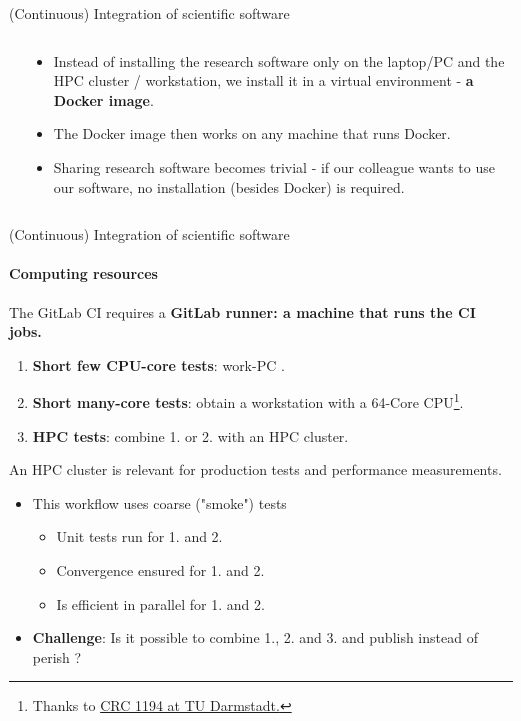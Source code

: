 \begin{frame}{(Continuous) Integration of scientific software}
\begin{columns}
\begin{column}[c]{0.4\textwidth}
        \end{column}
        \begin{column}[c]{0.6\textwidth}
            \begin{itemize}
                \item Instead of installing the research software only on the laptop/PC and the HPC cluster / workstation, we install it in a virtual environment - \textbf{a Docker image}.
                \item The Docker image then works on any machine that runs Docker. 
                \item Sharing research software becomes trivial - if our colleague wants to use our software, no installation (besides Docker) is required. 
            \end{itemize}
        \end{column}
    \end{columns}

\end{frame}

\begin{frame}{(Continuous) Integration of scientific software} 
\framesubtitle{Computing resources}
\vfill

    \vfill
    The GitLab CI requires a \textbf{GitLab runner: a machine that runs the CI jobs.}
    \begin{enumerate}
        \item \textbf{Short few CPU-core tests}: work-PC \faGraduationCap.    
        \item \textbf{Short many-core tests}: obtain a workstation with a 64-Core CPU\footnote{Thanks to \href{https://www.sfb1194.tu-darmstadt.de/index.en.jsp}{CRC 1194 at TU Darmstadt.}}\faGraduationCap.
        \item \textbf{HPC tests}: combine 1. or 2. with an HPC cluster. 
    \end{enumerate}

    An HPC cluster is relevant for production tests and performance measurements.
    \begin{itemize}
        \item This workflow uses coarse ("smoke") tests \faGraduationCap
            \begin{itemize}
                \item Unit tests run for 1. and 2.
                \item Convergence ensured for 1. and 2.
                \item Is efficient in parallel for 1. and 2. 
            \end{itemize}
        \item \textbf{Challenge}: Is it possible to combine 1., 2. and 3. and publish instead of perish \faGraduationCap?
    \end{itemize}

\end{frame}

